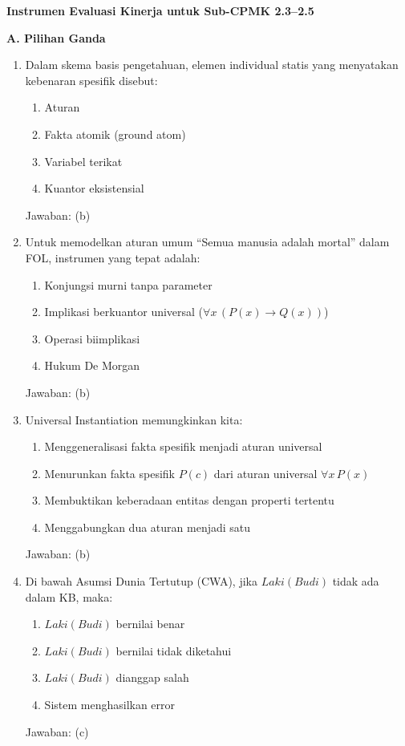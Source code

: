 \documentclass[../main]{subfiles}
\begin{document}
\begin{asesmen}
\textbf{Instrumen Evaluasi Kinerja untuk Sub-CPMK 2.3--2.5}

\textbf{A. Pilihan Ganda}
\begin{enumerate}
  \item Dalam skema basis pengetahuan, elemen individual statis yang menyatakan kebenaran spesifik disebut:
  \begin{enumerate}
    \item Aturan
    \item Fakta atomik (ground atom)
    \item Variabel terikat
    \item Kuantor eksistensial
  \end{enumerate}
  Jawaban: (b)

  \item Untuk memodelkan aturan umum ``Semua manusia adalah mortal'' dalam FOL, instrumen yang tepat adalah:
  \begin{enumerate}
    \item Konjungsi murni tanpa parameter
    \item Implikasi berkuantor universal ($\forall x\, (P(x) \rightarrow Q(x))$)
    \item Operasi biimplikasi
    \item Hukum De Morgan
  \end{enumerate}
  Jawaban: (b)

  \item Universal Instantiation memungkinkan kita:
  \begin{enumerate}
    \item Menggeneralisasi fakta spesifik menjadi aturan universal
    \item Menurunkan fakta spesifik $P(c)$ dari aturan universal $\forall x\, P(x)$
    \item Membuktikan keberadaan entitas dengan properti tertentu
    \item Menggabungkan dua aturan menjadi satu
  \end{enumerate}
  Jawaban: (b)

  \item Di bawah Asumsi Dunia Tertutup (CWA), jika $Laki(Budi)$ tidak ada dalam KB, maka:
  \begin{enumerate}
    \item $Laki(Budi)$ bernilai benar
    \item $Laki(Budi)$ bernilai tidak diketahui
    \item $Laki(Budi)$ dianggap salah
    \item Sistem menghasilkan error
  \end{enumerate}
  Jawaban: (c)


\end{enumerate}
\end{asesmen}
\end{document}
